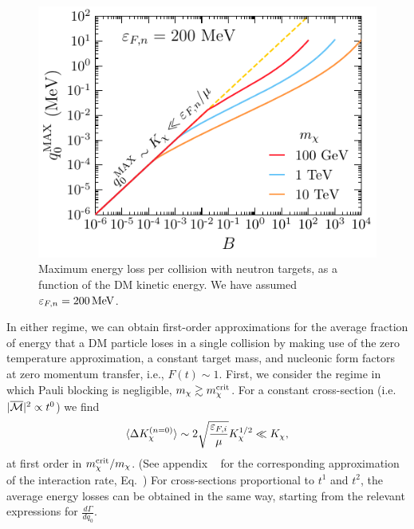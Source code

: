 \begin{figure}[t!bp]
  \centering
  \includegraphics{q0max_Tdm.pdf}
  \caption{Maximum energy loss per collision with neutron targets, as a function of the DM kinetic energy. We have assumed $\varepsilon_{F,n}=200{\rm \,MeV}$.} 
  \label{ch6:fig:q0max}
\end{figure}



In either regime, we can obtain first-order approximations for the average fraction of energy that a DM particle loses in a single collision by making use of the zero temperature approximation, a constant target mass, and nucleonic form factors at zero momentum transfer, i.e., $F(t)\sim1$. 
First, we consider the regime in which Pauli blocking is negligible, $m_\chi \gtrsim m_\chi^{\rm crit}$. For a constant cross-section (i.e. $|\overline{\mathcal M}|^2 \propto t^0$) we find 
\begin{equation}
  \langle \Delta K_\chi^{(n=0)} \rangle 
  \sim 2 \sqrt{\frac{\varepsilon_{F,i}}{\mu}} K_\chi^{1/2} \ll K_\chi, 
\label{ch6:eq:aveElossn0largem}
\end{equation}
at first order in $m_\chi^{\rm crit}/m_\chi$. (See appendix 
~ for the corresponding approximation of the interaction rate, Eq.~) 
For cross-sections proportional to $t^1$ and $t^2$, the average energy losses
can be obtained in the same way, starting from the relevant expressions for  $\frac{d\Gamma}{d q_0}$.

